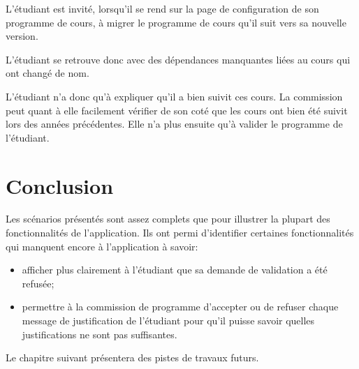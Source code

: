 L'étudiant est invité, lorsqu'il se rend sur la page de configuration de son programme de cours, à migrer le programme de cours qu'il suit vers sa nouvelle version.

L'étudiant se retrouve donc avec des dépendances manquantes liées au cours qui ont changé de nom. 

L'étudiant n'a donc qu'à expliquer qu'il a bien suivit ces cours. La commission peut quant à elle facilement vérifier de son coté que les cours ont bien été suivit lors des années précédentes. Elle n'a plus ensuite qu'à valider le programme de l'étudiant. 


\section{Conclusion}

Les scénarios présentés sont assez complets que pour illustrer la plupart des fonctionnalités de l'application. Ils ont permi d'identifier certaines fonctionnalités qui manquent encore à l'application à savoir:
\begin{itemize}
\item afficher plus clairement à l'étudiant que sa demande de validation a été refusée;
\item permettre à la commission de programme d'accepter ou de refuser chaque message de justification de l'étudiant pour qu'il puisse savoir quelles justifications ne sont pas suffisantes.
\end{itemize}

Le chapitre suivant présentera des pistes de travaux futurs. 